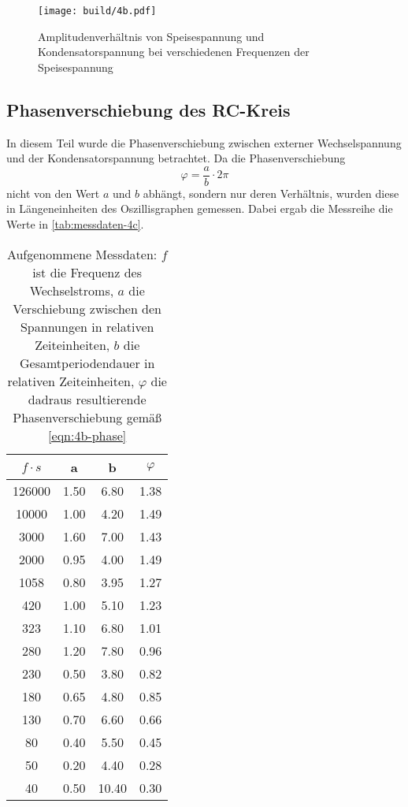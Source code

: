 \begin{figure}[H]
	\centering
	\texttt{[image: build/4b.pdf]}
	\caption{Amplitudenverhältnis von Speisespannung und Kondensatorspannung bei
	verschiedenen Frequenzen der Speisespannung}
	\label{fig:4b.pdf}
\end{figure}

\subsection{Phasenverschiebung des RC-Kreis}
\label{sec:4c-auswertung}

In diesem Teil wurde die Phasenverschiebung zwischen externer Wechselspannung und der 
Kondensatorspannung betrachtet. Da die Phasenverschiebung
\begin{equation}
	\varphi = \frac{a}{b} \cdot 2\pi
	\label{eqn:4b-phase}
\end{equation}
nicht von den Wert $a$ und $b$ abhängt, sondern nur deren Verhältnis, wurden diese
in Längeneinheiten des Oszillisgraphen gemessen. Dabei ergab die Messreihe die Werte in 
\autoref{tab:messdaten-4c}.

\begin{table}
	\centering
	\caption{Aufgenommene Messdaten: $f$ ist die Frequenz des Wechselstroms, $a$ die 
	Verschiebung zwischen den Spannungen in relativen Zeiteinheiten, $b$ die
	Gesamtperiodendauer in relativen Zeiteinheiten, $\varphi$ die dadraus resultierende
	Phasenverschiebung gemäß \autoref{eqn:4b-phase}}
	\label{tab:messdaten-4c}
	\begin{tabular}{c c c c}
		\toprule
		$f \cdot \si{s}$ &  a & b & $\varphi$ \\
		\midrule
		126000	&  1.50  &	 6.80  &	1.38 \\
		 10000	&  1.00  &	 4.20  &	1.49 \\
		  3000	&  1.60  &	 7.00  &	1.43 \\
		  2000	&  0.95  &	 4.00  &	1.49 \\
		1058  	&  0.80  &	 3.95  &	1.27 \\
		   420	&  1.00  &	 5.10  &	1.23 \\
		   323	&  1.10  &	 6.80  &	1.01 \\
		   280	&  1.20  &	 7.80  &	0.96 \\
		   230	&  0.50  &	 3.80  &	0.82 \\
		   180	&  0.65  &	 4.80  &	0.85 \\
		   130	&  0.70  &	 6.60  &	0.66 \\
		    80	&  0.40  &	 5.50  &	0.45 \\
		    50	&  0.20  &	 4.40  &	0.28 \\
		    40	&  0.50  &	10.40  &	0.30 \\
		\bottomrule
	\end{tabular}
\end{table}

